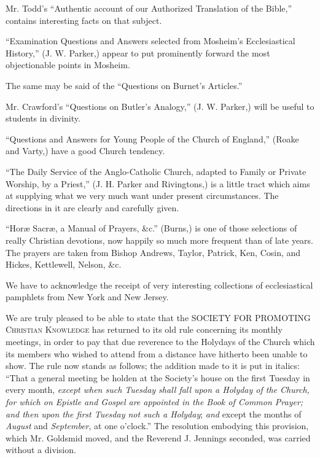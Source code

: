 Mr. Todd's ``Authentic account of our Authorized
Translation of the Bible,'' contains interesting facts on that subject.

``Examination Questions and Answers selected from
Mosheim's Ecclesiastical History,'' (J. W. Parker,) appear to put
prominently forward the most objectionable points in Mosheim.

The same may be said of the ``Questions on Burnet's
Articles.''

Mr. Crawford's ``Questions on Butler's Analogy,'' (J.
W. Parker,) will be useful to students in divinity.

``Questions and Answers for Young People of the
Church of England,'' (Roake and Varty,) have a good Church tendency.

``The Daily Service of the Anglo-Catholic Church,
adapted to Family or Private Worship, by a Priest,'' (J. H. Parker and
Rivingtons,) is a little tract which aims at supplying what we very much
want under present circumstances. The directions in it are clearly and
carefully given.

``Horæ Sacræ, a Manual of Prayers, \&c.''
(Burns,) is one of those selections of really Christian devotions, now
happily so much more frequent than of late years. The prayers are taken
from Bishop Andrews, Taylor, Patrick, Ken, Cosin, and Hickes, Kettlewell,
Nelson, \&c.

We have to acknowledge the receipt of very
interesting collections of ecclesiastical pamphlets from New York and
New Jersey.

We are truly pleased to be able to state that the SOCIETY
FOR PROMOTING C\textsc{hristian} K\textsc{nowledge}
has returned to its old rule concerning its monthly meetings, in order
to pay that due reverence to the Holydays of the Church which its
members who wished to attend from a distance have hitherto been unable
to show. The rule now stands as follows; the addition made to it is put
in italics: ``That a general meeting be holden at the Society's house on
the first Tuesday in every month, \emph{except when such Tuesday shall fall
upon a Holyday of the Church, for which on Epistle and Gospel are
appointed in the Book of Common Prayer; and then upon the first Tuesday
not such a Holyday}; \emph{and} except the months of \emph{August}
and \emph{September}, at one o'clock.'' The resolution embodying this
provision, which Mr. Goldsmid moved, and the Reverend J. Jennings
seconded, was carried without a division.

